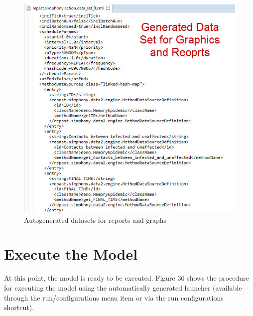 \documentclass[11pt]{amsart}
\begin{document}
\begin{figure}[ht]
\begin{center}
\vspace{.2in}
\centerline {
\includegraphics[totalheight=0.5\textheight]{images/033.jpg}
}
\caption{Autogenerated datasets for reports and graphs}
\label{fig:033}
\end{center}
\end{figure}

\newpage

\section{Execute the Model}
At this point, the model is ready to be executed. Figure 36 shows the procedure for executing the model using the automatically generated launcher (available through the run/configurations menu item or via the run configurations shortcut).
\end{document}
